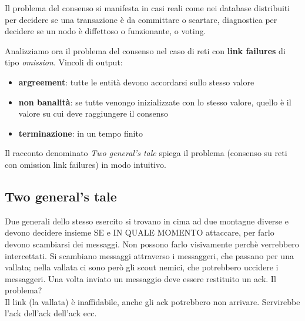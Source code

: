 Il problema del consenso si manifesta in casi reali come nei database distribuiti per decidere se una transazione è da committare o scartare,
diagnostica per decidere se un nodo è diffettoso o funzionante, o voting.

Analizziamo ora il problema del consenso nel caso di reti con \textbf{link failures} di tipo \textit{omission}.
Vincoli di output:
\begin{itemize}
  \item \textbf{argreement}: tutte le entità devono accordarsi sullo stesso valore
  \item \textbf{non banalità}: se tutte venongo inizializzate con lo stesso valore, quello è il valore su cui deve raggiungere
  il consenso
  \item \textbf{terminazione}: in un tempo finito
\end{itemize}

Il racconto denominato \textit{Two general's tale} spiega il problema (consenso su reti con omission link failures) in modo intuitivo.

\subsection{Two general's tale}
Due generali dello stesso esercito si trovano in cima ad due montagne diverse e devono decidere insieme SE e IN QUALE MOMENTO attaccare, 
per farlo devono scambiarsi dei messaggi. Non possono farlo visivamente perchè verrebbero intercettati.
Si scambiano messaggi attraverso i messaggeri, che passano per una vallata; nella vallata ci sono però gli scout nemici, che potrebbero
uccidere i messaggeri. Una volta inviato un messaggio deve essere restituito un ack. Il problema?\\
Il link (la vallata) è inaffidabile, anche gli ack potrebbero non arrivare. Servirebbe l'ack dell'ack dell'ack ecc.



